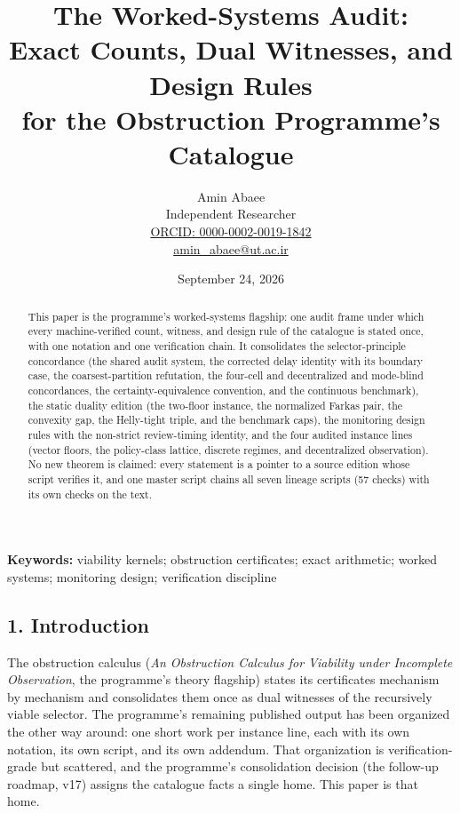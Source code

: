 \documentclass[10pt,twocolumn]{article}
\theoremstyle{definition}
\begin{document}
\title{The Worked-Systems Audit:\\ Exact Counts, Dual Witnesses, and Design Rules\\ for the Obstruction Programme's Catalogue}
\author{Amin Abaee\\[0.35em]
{\small Independent Researcher}\\[0.55em]
{\small\href{https://orcid.org/0000-0002-0019-1842}{ORCID: 0000-0002-0019-1842}}\\[0.3em]
{\small\href{mailto:amin\_abaee@ut.ac.ir}{amin\_abaee@ut.ac.ir}}}
\date{September 24, 2026}
\maketitle

\begin{abstract}
This paper is the programme's worked-systems flagship: one audit frame under
which every machine-verified count, witness, and design rule of the catalogue
is stated once, with one notation and one verification chain. It consolidates
the selector-principle concordance (the shared audit system, the corrected
delay identity with its boundary case, the coarsest-partition refutation, the
four-cell and decentralized and mode-blind concordances, the
certainty-equivalence convention, and the continuous benchmark), the static
duality edition (the two-floor instance, the normalized Farkas pair, the
convexity gap, the Helly-tight triple, and the benchmark caps), the monitoring
design rules with the non-strict review-timing identity, and the four audited
instance lines (vector floors, the policy-class lattice, discrete regimes, and
decentralized observation). No new theorem is claimed: every statement is a
pointer to a source edition whose script verifies it, and one master script
chains all seven lineage scripts (57 checks) with its own checks on the text.
\end{abstract}

\textbf{Keywords:} viability kernels; obstruction certificates; exact
arithmetic; worked systems; monitoring design; verification discipline

\subsection{1. Introduction}\label{introduction}

The obstruction calculus (\emph{An Obstruction Calculus for Viability under
Incomplete Observation}, the programme's theory flagship) states its
certificates mechanism by mechanism and consolidates them once as dual
witnesses of the recursively viable selector. The programme's remaining
published output has been organized the other way around: one short work per
instance line, each with its own notation, its own script, and its own
addendum. That organization is verification-grade but scattered, and the
programme's consolidation decision (the follow-up roadmap, v17) assigns the
catalogue facts a single home. This paper is that home.
\end{document}
